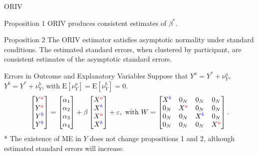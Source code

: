 \begin{frame}{ORIV}
    \begin{block}{Proposition 1}
        ORIV produces consistent estimates of $\beta^{*}$.
    \end{block}
    \vspace{3mm}
    \begin{block}{Proposition 2}
        The ORIV estimator satisfies asymptotic normality under standard conditions. The estimated standard errors, when clustered by participant, are consistent estimates of the asymptotic standard errors.
    \end{block}
\end{frame}

\begin{frame}{Errors in Outcome and Explanatory Variables}
Suppose that $Y^{a} = Y^{*} + \nu_{Y}^{a}$, $Y^{b} = Y^{*} + \nu_{Y}^{b}$, with $\text{E}[\nu_{Y}^{a}] = \text{E}[\nu_{Y}^{b}] = 0$.
    \begin{equation*}\begin{split}
        \begin{bmatrix}
        Y^{\color{red}a} \\ Y^{\color{red}a} \\ Y^{\color{blue}b} \\ Y^{\color{blue}b} \end{bmatrix}
        =
        \begin{bmatrix}
            \alpha_{1} \\ \alpha_{2} \\ \alpha_{3} \\ \alpha_{4}
        \end{bmatrix}
        + \beta
        \begin{bmatrix}
            X^{\color{red}a} \\ X^{\color{blue}b} \\ X^{\color{red}a} \\ X^{\color{blue}b}
        \end{bmatrix}
        + \varepsilon, \text{ with } W=
    \begin{bmatrix}
        X^{\color{blue}b} & 0_{N} & 0_{N} & 0_{N} \\
        0_{N} & X^{\color{red}a} & 0_{N} & 0_{N} \\
        0_{N} & 0_{N} & X^{\color{blue}b} & 0_{N} \\
        0_{N} & 0_{N} & 0_{N} & X^{\color{red}a} \\
    \end{bmatrix}.
    \end{split}
    \end{equation*}
\small{\color{blue}* The existence of ME in $Y$ does not change propositions 1 and 2, although estimated standard errors will increase.}
\end{frame}

